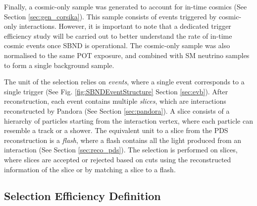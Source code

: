 Finally, a cosmic-only sample was generated to account for in-time cosmics (See Section \ref{sec:gen_corsika}).
This sample consists of events triggered by cosmic-only interactions.
However, it is important to note that a dedicated trigger efficiency study will be carried out to better understand the rate of in-time cosmic events once SBND is operational.
The cosmic-only sample was also normalised to the same POT exposure, and combined with SM neutrino samples to form a single background sample.  

The unit of the selection relies on \textit{events}, where a single event corresponds to a single trigger (See Fig. \ref{fig:SBNDEventStructure} Section \ref{sec:evb}).
After reconstruction, each event contains multiple \textit{slices}, which are interactions reconstructed by Pandora (See Section \ref{sec:pandora}).
A slice consists of a hierarchy of particles starting from the interaction vertex, where each particle can resemble a track or a shower.
The equivalent unit to a slice from the PDS reconstruction is a \textit{flash}, where a flash contains all the light produced from an interaction (See Section \ref{sec:reco_pds}).
The selection is performed on slices, where slices are accepted or rejected based on cuts using the reconstructed information of the slice or by matching a slice to a flash.


\subsection{Selection Efficiency Definition}
\label{sec:select_eff}



